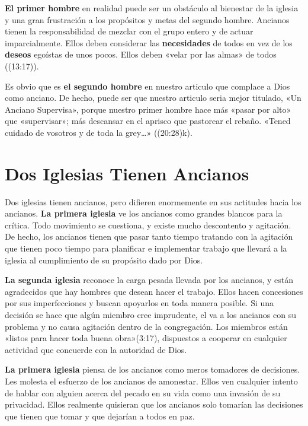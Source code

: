 \documentclass[12pt, twoside, openright]{book}
\begin{document}
\textbf{El primer hombre} en realidad puede ser un obstáculo al bienestar de la iglesia y una gran frustración a los propósitos y metas del segundo hombre. Ancianos tienen la responsabilidad de mezclar con el grupo entero y de actuar imparcialmente. Ellos deben considerar las \textbf{necesidades} de todos en vez de los \textbf{deseos} egoístas de unos pocos. Ellos deben «velar por las almas» de todos ((13:17)).

Es obvio que es \textbf{el segundo hombre} en nuestro articulo que complace a Dios como anciano. De hecho, puede ser que nuestro articulo seria mejor titulado, «Un Anciano Supervisa», porque nuestro primer hombre hace más «pasar por alto» que «supervisar»; más descansar en el aprisco que pastorear el rebaño. «Tened cuidado de vosotros y de toda la grey\ldots» ((20:28)k).

\section{Dos Iglesias Tienen Ancianos}
Dos iglesias tienen ancianos, pero difieren enormemente en sus actitudes hacia los ancianos. \textbf{La primera iglesia} ve los ancianos como grandes blancos para la crítica. Todo movimiento se cuestiona, y existe mucho descontento y agitación. De hecho, los ancianos tienen que pasar tanto tiempo tratando con la agitación que tienen poco tiempo para planificar e implementar trabajo que llevará a la iglesia al cumplimiento de su propósito dado por Dios. 

\textbf{La segunda iglesia} reconoce la carga pesada llevada por los ancianos, y están agradecidos que hay hombres que desean hacer el trabajo. Ellos hacen concesiones por sus imperfecciones y buscan apoyarlos en toda manera posible. Si una decisión se hace que algún miembro cree imprudente, el va a los ancianos con su problema y no causa agitación dentro de la congregación. Los miembros están «listos para hacer toda buena obra»(3:17), dispuestos a cooperar en cualquier actividad que concuerde con la autoridad de Dios. 

\textbf{La primera iglesia} piensa de los ancianos como meros tomadores de decisiones. Les molesta el esfuerzo de los ancianos de amonestar. Ellos ven cualquier intento de hablar con alguien acerca del pecado en su vida como una invasión de su privacidad. Ellos realmente quisieran que los ancianos solo tomarían las decisiones que tienen que tomar y que dejarían a todos en paz. 
\end{document}
